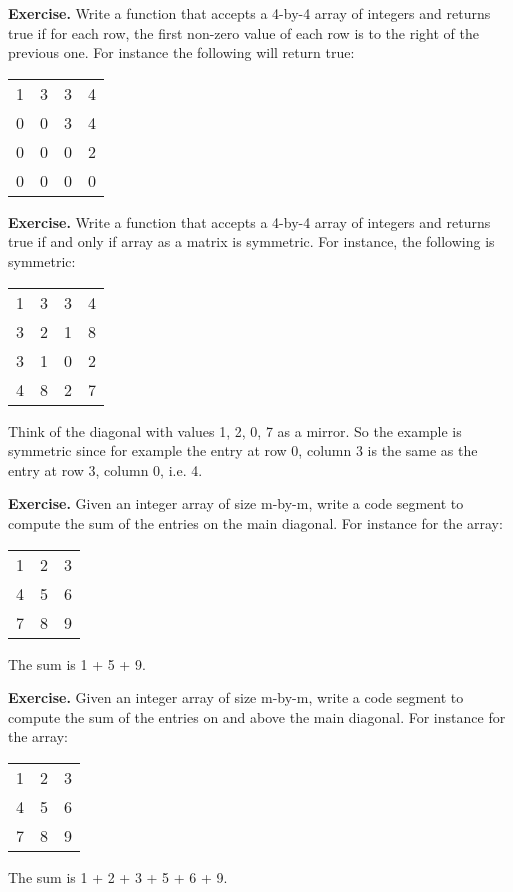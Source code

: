 \documentclass[
]{article}
\begin{document}
\textbf{Exercise.} Write a function that accepts a 4-by-4 array of
integers and returns true if for each row, the first non-zero value of
each row is to the right of the previous one. For instance the following
will return true:

\begin{longtable}[]{@{}llll@{}}
\toprule
\endhead
1 & 3 & 3 & 4\tabularnewline
0 & 0 & 3 & 4\tabularnewline
0 & 0 & 0 & 2\tabularnewline
0 & 0 & 0 & 0\tabularnewline
\bottomrule
\end{longtable}

\textbf{Exercise.} Write a function that accepts a 4-by-4 array of
integers and returns true if and only if array as a matrix is symmetric.
For instance, the following is symmetric:

\begin{longtable}[]{@{}llll@{}}
\toprule
\endhead
1 & 3 & 3 & 4\tabularnewline
3 & 2 & 1 & 8\tabularnewline
3 & 1 & 0 & 2\tabularnewline
4 & 8 & 2 & 7\tabularnewline
\bottomrule
\end{longtable}

Think of the diagonal with values 1, 2, 0, 7 as a mirror. So the example
is symmetric since for example the entry at row 0, column 3 is the same
as the entry at row 3, column 0, i.e. 4.

\textbf{Exercise.} Given an integer array of size m-by-m, write a code
segment to compute the sum of the entries on the main diagonal. For
instance for the array:

\begin{longtable}[]{@{}lll@{}}
\toprule
\endhead
1 & 2 & 3\tabularnewline
4 & 5 & 6\tabularnewline
7 & 8 & 9\tabularnewline
\bottomrule
\end{longtable}

The sum is 1 + 5 + 9.

\textbf{Exercise.} Given an integer array of size m-by-m, write a code
segment to compute the sum of the entries on and above the main
diagonal. For instance for the array:

\begin{longtable}[]{@{}lll@{}}
\toprule
\endhead
1 & 2 & 3\tabularnewline
4 & 5 & 6\tabularnewline
7 & 8 & 9\tabularnewline
\bottomrule
\end{longtable}

The sum is 1 + 2 + 3 + 5 + 6 + 9.
\end{document}
